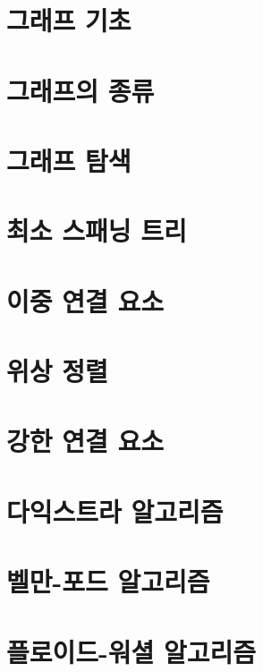 \chapter{그래프 기초}


\chapter{그래프의 종류}


\chapter{그래프 탐색}


\chapter{최소 스패닝 트리}


\chapter{이중 연결 요소}


\chapter{위상 정렬}


\chapter{강한 연결 요소}


\chapter{다익스트라 알고리즘}


\chapter{벨만-포드 알고리즘}


\chapter{플로이드-워셜 알고리즘}


